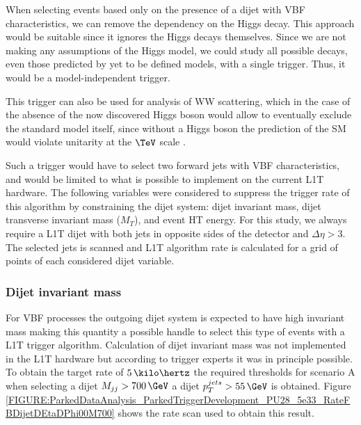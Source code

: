 When selecting events based only on the presence of a dijet with \gls{VBF} characteristics, we can remove the dependency on the Higgs decay. This approach would be suitable since it ignores the Higgs decays themselves. Since we are not making any assumptions of the Higgs model, we could study all possible decays, even those predicted by yet to be defined models, with a single trigger. Thus, it would be a model-independent trigger.

This trigger can also be used for analysis of WW scattering, which in the case of the absence of the now discovered Higgs boson would allow to eventually exclude the standard model itself, since without a Higgs boson the prediction of the \gls{SM} would violate unitarity at the $\TeV$ scale \cite{BOOK:PerspectivesonHiggsPhysicsII}.

Such a trigger would have to select two forward jets with \gls{VBF} characteristics, and would be limited to what is possible to implement on the current \gls{L1T} hardware. The following variables were considered to suppress the trigger rate of this algorithm by constraining the dijet system: dijet invariant mass, dijet transverse invariant mass ($M_{T}$), and event \gls{HT} energy. For this study, we always require a \gls{L1T} dijet with both jets in opposite sides of the detector and $\Delta\eta>3$. The selected jets \pt is scanned and \gls{L1T} algorithm rate is calculated for a grid of points of each considered dijet variable.

\subsubsection{Dijet invariant mass}


For \gls{VBF} processes the outgoing dijet system is expected to have high invariant mass making this quantity a possible handle to select this type of events with a \gls{L1T} trigger algorithm. Calculation of dijet invariant mass was not implemented in the \gls{L1T} hardware but according to trigger experts it was in principle possible. To obtain the target rate of $5\,\kilo\hertz$ the required thresholds for scenario A when selecting a dijet $M_{jj}>700\,\GeV$ a dijet $p_T^{jets}>55\,\GeV$ is obtained. Figure \ref{FIGURE:ParkedDataAnalysis_ParkedTriggerDevelopment_PU28_5e33_RateFBDijetDEtaDPhi00M700} shows the rate scan used to obtain this result.

